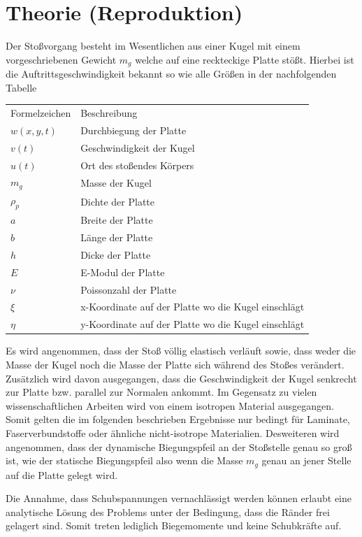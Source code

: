 \chapter{Theorie (Reproduktion)}
\label{chap:Principles}

Der Stoßvorgang besteht im Wesentlichen aus einer Kugel mit einem vorgeschriebenen Gewicht $m_g$ welche auf eine reckteckige Platte stößt. Hierbei ist die Auftrittsgeschwindigkeit bekannt so wie alle Größen in der nachfolgenden Tabelle

\begin{tabular}[h]{l | l}
	Formelzeichen & Beschreibung \\
	$w(x,y,t)$ & Durchbiegung der Platte \\
	$v(t)$ & Geschwindigkeit der Kugel\\
	$u(t)$ & Ort des stoßendes Körpers \\
	$m_g$ & Masse der Kugel \\
	$\rho_p$ & Dichte der Platte\\
	$a$ & Breite der Platte\\
	$b$ & Länge der Platte\\
	$h$ & Dicke der Platte \\
	$E$ & E-Modul der Platte \\
	$\nu$ & Poissonzahl der Platte \\
	$\xi$ & x-Koordinate auf der Platte wo die Kugel einschlägt \\
	$\eta$ & y-Koordinate auf der Platte wo die Kugel einschlägt \\
\end{tabular}

Es wird angenommen, dass der Stoß völlig elastisch verläuft sowie, dass weder die Masse der Kugel noch die Masse der Platte sich während des Stoßes verändert.
Zusätzlich wird davon ausgegangen, dass die Geschwindigkeit der Kugel senkrecht zur Platte bzw. parallel zur Normalen ankommt. Im Gegensatz zu vielen wissenschaftlichen Arbeiten wird von einem isotropen Material ausgegangen. Somit gelten die im folgenden beschrieben Ergebnisse nur bedingt für Laminate, Faserverbundstoffe oder ähnliche nicht-isotrope Materialien. Desweiteren wird angenommen, dass der dynamische Biegungspfeil an der Stoßstelle genau so groß ist, wie der statische Biegungspfeil also wenn die Masse $m_g$ genau an jener Stelle auf die Platte gelegt wird.

Die Annahme, dass Schubspannungen vernachlässigt werden können erlaubt eine analytische Lösung des Problems unter der Bedingung, dass die Ränder frei gelagert sind. Somit treten lediglich Biegemomente und keine Schubkräfte auf.

